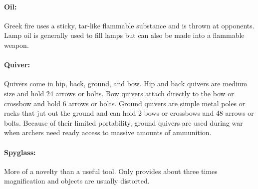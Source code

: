 \begin{multicols}{2}
\paragraph{Oil:}  Greek fire uses a sticky, tar-like flammable substance and is thrown at opponents.  Lamp oil is generally used to fill lamps but can also be made into a flammable weapon.

\paragraph{Quiver:} Quivers come in hip, back, ground, and bow.  Hip and back quivers are medium size and hold 24 arrows or bolts.  Bow quivers attach directly to the bow or crossbow and hold 6 arrows or bolts.  Ground quivers are simple metal poles or racks that jut out the ground and can hold 2 bows or crossbows and 48 arrows or bolts.  Because of their limited portability, ground quivers are used during war when archers need ready access to massive amounts of ammunition.

\paragraph{Spyglass:}  More of a novelty than a useful tool.  Only provides about three times magnification and objects are usually distorted.

\noindent
\begin{minipage}{\columnwidth}


\end{minipage}
\end{multicols}
